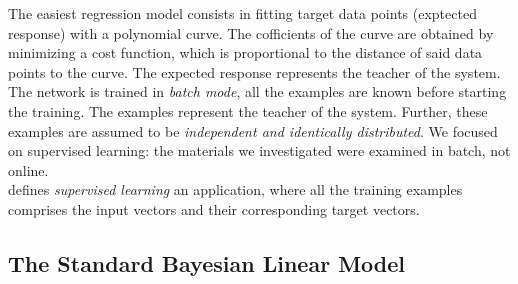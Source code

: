 The easiest regression model consists in fitting target data
points (exptected response) with a polynomial curve.
The cofficients of the curve are obtained by minimizing a cost function, which
is proportional to the distance of said data points to the curve.
The expected response represents the teacher of the system.
The network is trained in \textit{batch mode}, all the examples are known before
starting the training.
The examples represent the teacher of the system.
Further, these examples are assumed to be \textit{independent and identically
distributed}.
We focused on supervised learning: the materials we investigated
were examined in batch, not online.\\
\citet{RefWorks:194} defines \textit{supervised learning} an application, where all the
training examples comprises the input vectors and their corresponding target
vectors.


\subsection{The Standard Bayesian Linear Model}
\label{subsec:standardlinearmodel}

